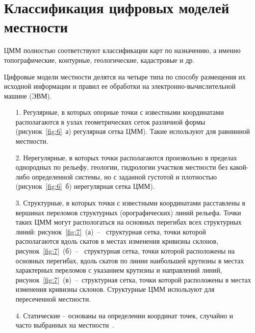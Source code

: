 \section{Классификация цифровых моделей местности}

ЦММ полностью соответствуют классификации карт по назначению, а именно топографические, контурные, геологические, кадастровые и др.

Цифровые модели местности делятся на четыре типа по способу размещения их исходной информации и правил ее обработки на электронно-вычислительной машине (ЭВМ). 

\begin{enumerate} 
  \item[1.] Регулярные, в которых опорные точки с известными координатами располагаются в узлах геометрических сеток различной формы (рисунок~\ref{fig:6}~а) регулярная сетка ЦММ). Такие используют для равнинной местности.
 
  \item[2.] Нерегулярные, в которых точки располагаются произвольно в пределах однородных по рельефу, геологии, гидрологии участков местности без какой-либо определенной системы, но с заданной густотой и плотностью (рисунок~\ref{fig:6}~б) нерегулярная сетка ЦММ).

  \item[3.] Структурные, в которых точки с известными координатами расставлены в вершинах переломов структурных (орографических) линий рельефа. Точки таких ЦММ могут распологаться на основных перегибах всех структурных линий: рисунок~\ref{fig:7}~(а)~--~ структурная сетка, точки которой располагаются вдоль скатов в местах изменения кривизны склонов, рисунок~\ref{fig:7}~(б)~--~ структурная сетка, точки которой расположены на основных перегибах, вдоль скатов по линии наибольшей крутизны в местах характерных переломов с указанием крутизны и направлений линий, рисунок~\ref{fig:7}~(в)~--~структурная сетка, точки которой расположены в местах изменения кривизны склонов. Структурные ЦММ используют для пересеченной местности.

   \item[4.] Статические -- основаны на определении координат точек, случайно и часто выбранных на местности~\cite{23}.
\end{enumerate} 

